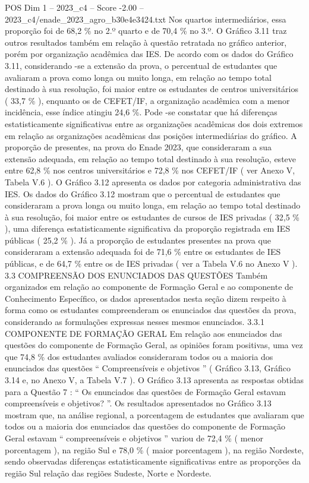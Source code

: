 \begin{textsample}{POS Dim 1 – 2023\_c4 – Score -2.00 – 2023\_c4/enade\_2023\_agro\_b30e4e3424.txt}
Nos quartos intermediários, essa proporção foi de 68,2 \% no 2.º quarto e de 70,4 \% no 3.º.
O Gráfico 3.11 traz outros resultados também em relação à questão retratada no gráfico anterior, porém por organização acadêmica das IES.
De acordo com os dados do Gráfico 3.11, considerando -se a extensão da prova, o percentual de estudantes que avaliaram a prova como longa ou muito longa, em relação ao tempo total destinado à sua resolução, foi maior entre os estudantes de centros universitários ( 33,7 \% ), enquanto os de CEFET/IF, a organização acadêmica com a menor incidência, esse índice atingiu 24,6 \%.
Pode -se constatar que há diferenças estatisticamente significativas entre as organizações acadêmicas dos dois extremos em relação as organizações acadêmicas das posições intermediárias do gráfico.
A proporção de presentes, na prova do Enade 2023, que consideraram a sua extensão adequada, em relação ao tempo total destinado à sua resolução, esteve entre 62,8 \% nos centros universitários e 72,8 \% nos CEFET/IF ( ver Anexo V, Tabela V.6 ).
O Gráfico 3.12 apresenta os dados por categoria administrativa das IES.
Os dados do Gráfico 3.12 mostram que o percentual de estudantes que consideraram a prova longa ou muito longa, em relação ao tempo total destinado à sua resolução, foi maior entre os estudantes de cursos de IES privadas ( 32,5 \% ), uma diferença estatisticamente significativa da proporção registrada em IES públicas ( 25,2 \% ).
Já a proporção de estudantes presentes na prova que consideraram a extensão adequada foi de 71,6 \% entre os estudantes de IES públicas, e de 64,7 \% entre os de IES privadas ( ver a Tabela V.6 no Anexo V ). 3.3 COMPREENSÃO DOS ENUNCIADOS DAS QUESTÕES Também organizados em relação ao componente de Formação Geral e ao componente de Conhecimento Específico, os dados apresentados nesta seção dizem respeito à forma como os estudantes compreenderam os enunciados das questões da prova, considerando as formulações expressas nesses mesmos enunciados. 3.3.1 COMPONENTE DE FORMAÇÃO GERAL Em relação aos enunciados das questões do componente de Formação Geral, as opiniões foram positivas, uma vez que 74,8 \% dos estudantes avaliados consideraram todos ou a maioria dos enunciados das questões “ Compreensíveis e objetivos ” ( Gráfico 3.13, Gráfico 3.14 e, no Anexo V, a Tabela V.7 ).
O Gráfico 3.13 apresenta as respostas obtidas para a Questão 7 : “ Os enunciados das questões de Formação Geral estavam compreensíveis e objetivos? ”.
Os resultados apresentados no Gráfico 3.13 mostram que, na análise regional, a porcentagem de estudantes que avaliaram que todos ou a maioria dos enunciados das questões do componente de Formação Geral estavam “ compreensíveis e objetivos ” variou de 72,4 \% ( menor porcentagem ), na região Sul e 78,0 \% ( maior porcentagem ), na região Nordeste, sendo observadas diferenças estatisticamente significativas entre as proporções da região Sul relação das regiões Sudeste, Norte e Nordeste.

\end{textsample}
